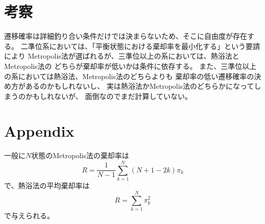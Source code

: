 \documentclass{jarticle}
\begin{document}
\section{考察}

遷移確率は詳細釣り合い条件だけでは決まらないため、そこに自由度が存在する。
二準位系においては、「平衡状態における棄却率を最小化する」という要請により
Metropolis法が選ばれるが、三準位以上の系においては、熱浴法とMetropolis法の
どちらが棄却率が低いかは条件に依存する。
また、三準位以上の系においては熱浴法、Metropolis法のどちらよりも
棄却率の低い遷移確率の決め方があるのかもしれないし、
実は熱浴法かMetropolis法のどちらかになってしまうのかもしれないが、
面倒なのでまだ計算していない。


\section{Appendix}

一般に$N$状態のMetropolis法の棄却率は
\begin{equation}
R = \frac{1}{N-1}\sum_{k=1}^N (N+1-2k) \pi_k
\end{equation}
で、熱浴法の平均棄却率は
\begin{equation}
R = \sum_{k=1}^N \pi_k^2
\end{equation}
で与えられる。
\end{document}
